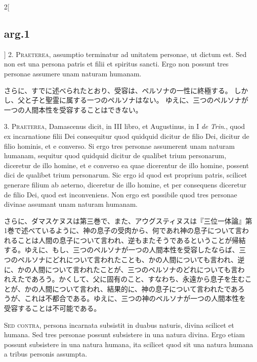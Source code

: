 \documentclass[paper=a4paper,fontsize=10pt,jafontsize=9pt,titlepage]{jlreq}
\begin{document}
\begin{paracol}{2}[\subsection{arg.1}]
2. {\scshape Praeterea}, assumptio terminatur ad unitatem personae, ut dictum est. Sed
non est una persona patris et filii et spiritus sancti. Ergo non possunt
tres personae assumere unam naturam humanam.

\switchcolumn

さらに、すでに述べられたとおり、受容は、ペルソナの一性に終極する。
しかし、父と子と聖霊に属する一つのペルソナはない。
ゆえに、三つのペルソナが一つの人間本性を受容することはできない。


3. {\scshape Praeterea}, Damascenus dicit, in III libro, et Augustinus, in I {\itshape
 de Trin}.,
quod ex incarnatione filii Dei consequitur quod quidquid dicitur de
filio Dei, dicitur de filio hominis, et e converso. Si ergo tres
personae assumerent unam naturam humanam, sequitur quod quidquid dicitur
de qualibet trium personarum, diceretur de illo homine, et e converso ea
quae dicerentur de illo homine, possent dici de qualibet trium
personarum. Sic ergo id quod est proprium patris, scilicet generare
filium ab aeterno, diceretur de illo homine, et per consequens diceretur
de filio Dei, quod est inconveniens. Non ergo est possibile quod tres
personae divinae assumant unam naturam humanam.

\switchcolumn

さらに、ダマスケヌスは第三巻で、また、アウグスティヌスは『三位一体論』第
 1巻で述べているように、神の息子の受肉から、何であれ神の息子について言わ
 れることは人間の息子について言われ、逆もまたそうであるということが帰結
 する。ゆえに、もし、三つのペルソナが一つの人間本性を受容したならば、三
 つのペルソナにどれについて言われたことも、かの人間についても言われ、逆
 に、かの人間について言われたことが、三つのペルソナのどれについても言わ
 れえたであろう。かくして、父に固有のこと、すなわち、永遠から息子を生むこ
 とが、かの人間について言われ、結果的に、神の息子について言われたであろ
 うが、これは不都合である。ゆえに、三つの神のペルソナが一つの人間本性を
 受容することは不可能である。

\switchcolumn*[\subsection{s.c.}]

{\scshape Sed contra}, persona incarnata subsistit in duabus naturis, divina
scilicet et humana. Sed tres personae possunt subsistere in una natura
divina. Ergo etiam possunt subsistere in una natura humana, ita scilicet
quod sit una natura humana a tribus personis assumpta.


\end{paracol}
\end{document}
